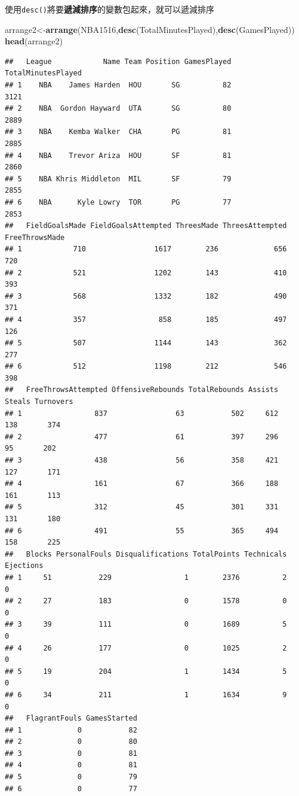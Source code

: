\documentclass[]{book}
\newenvironment{Shaded}{\begin{snugshade}}{\end{snugshade}}
\newcommand{\KeywordTok}[1]{\textcolor[rgb]{0.13,0.29,0.53}{\textbf{{#1}}}}
\newcommand{\NormalTok}[1]{{#1}}
\theoremstyle{definition}
\theoremstyle{definition}
\theoremstyle{remark}
\begin{document}
使用\texttt{desc()}將要\textbf{遞減排序}的變數包起來，就可以遞減排序

\begin{Shaded}
\begin{Highlighting}[]
\NormalTok{arrange2<-}\KeywordTok{arrange}\NormalTok{(NBA1516,}\KeywordTok{desc}\NormalTok{(TotalMinutesPlayed),}\KeywordTok{desc}\NormalTok{(GamesPlayed))}
\KeywordTok{head}\NormalTok{(arrange2)}
\end{Highlighting}
\end{Shaded}

\begin{verbatim}
##   League            Name Team Position GamesPlayed TotalMinutesPlayed
## 1    NBA    James Harden  HOU       SG          82               3121
## 2    NBA  Gordon Hayward  UTA       SG          80               2889
## 3    NBA    Kemba Walker  CHA       PG          81               2885
## 4    NBA    Trevor Ariza  HOU       SF          81               2860
## 5    NBA Khris Middleton  MIL       SF          79               2855
## 6    NBA      Kyle Lowry  TOR       PG          77               2853
##   FieldGoalsMade FieldGoalsAttempted ThreesMade ThreesAttempted FreeThrowsMade
## 1            710                1617        236             656            720
## 2            521                1202        143             410            393
## 3            568                1332        182             490            371
## 4            357                 858        185             497            126
## 5            507                1144        143             362            277
## 6            512                1198        212             546            398
##   FreeThrowsAttempted OffensiveRebounds TotalRebounds Assists Steals Turnovers
## 1                 837                63           502     612    138       374
## 2                 477                61           397     296     95       202
## 3                 438                56           358     421    127       171
## 4                 161                67           366     188    161       113
## 5                 312                45           301     331    131       180
## 6                 491                55           365     494    158       225
##   Blocks PersonalFouls Disqualifications TotalPoints Technicals Ejections
## 1     51           229                 1        2376          2         0
## 2     27           183                 0        1578          0         0
## 3     39           111                 0        1689          5         0
## 4     26           177                 0        1025          2         0
## 5     19           204                 1        1434          5         0
## 6     34           211                 1        1634          9         0
##   FlagrantFouls GamesStarted
## 1             0           82
## 2             0           80
## 3             0           81
## 4             0           81
## 5             0           79
## 6             0           77
\end{verbatim}
\end{document}
